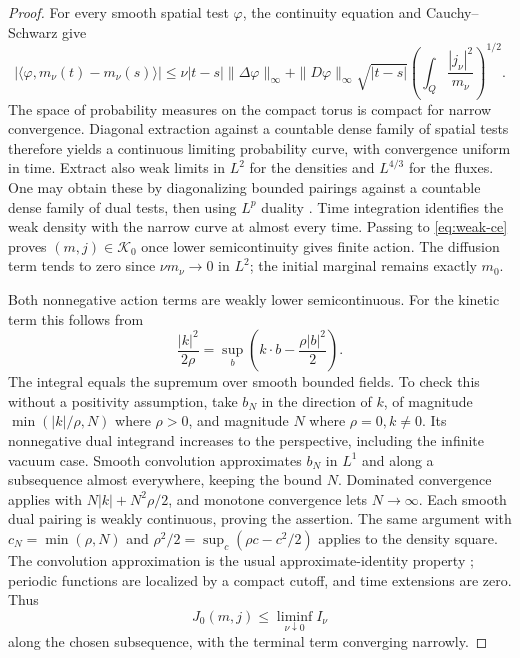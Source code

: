 \documentclass[11pt]{article}
\numberwithin{equation}{section}
\begin{document}
\begin{proof}
For every smooth spatial test \(\varphi\), the continuity equation and
Cauchy--Schwarz give
\begin{equation}\label{eq:narrow-mod}
 |\langle\varphi,m_\nu(t)-m_\nu(s)\rangle|
 \le \nu|t-s|\|\Delta\varphi\|_\infty
 +\|D\varphi\|_\infty\sqrt{|t-s|}
              \left(\int_Q\frac{|j_\nu|^2}{m_\nu}\right)^{1/2}.
\end{equation}
The space of probability measures on the compact torus is compact for narrow
convergence. Diagonal extraction against a countable dense family of
spatial tests therefore yields a continuous limiting probability curve,
with convergence uniform in time. Extract also weak limits in \(L^2\)
for the densities and \(L^{4/3}\) for the fluxes. One may obtain these
by diagonalizing bounded pairings against a countable dense family of
dual tests, then using \(L^p\) duality
\cite[Theorem~6.15, p.~190]{Folland}. Time integration identifies the weak
density with the narrow curve at almost every time.
Passing to \eqref{eq:weak-ce} proves
\((m,j)\in\mathcal K_0\) once lower semicontinuity gives finite action.
The diffusion term tends to zero since \(\nu m_\nu\to0\) in \(L^2\);
the initial marginal remains exactly \(m_0\).

Both nonnegative action terms are weakly lower semicontinuous. For the
kinetic term this follows from
\[
 \frac{|k|^2}{2\rho}
       =\sup_b\left(k\cdot b-\frac{\rho|b|^2}{2}\right).
\]
The integral equals the supremum over smooth bounded fields. To check
this without a positivity assumption, take \(b_N\) in the direction
of \(k\), of magnitude \(\min(|k|/\rho,N)\) where \(\rho>0\),
and magnitude \(N\) where \(\rho=0,k\ne0\).
Its nonnegative dual integrand increases to the perspective, including
the infinite vacuum case. Smooth convolution approximates \(b_N\)
in \(L^1\) and along a subsequence almost everywhere, keeping the
bound \(N\). Dominated convergence applies with
\(N|k|+N^2\rho/2\), and monotone convergence lets \(N\to\infty\).
Each smooth dual pairing is weakly continuous, proving the assertion.
The same argument with \(c_N=\min(\rho,N)\) and
\(\rho^2/2=\sup_c(\rho c-c^2/2)\) applies to the density square.
The convolution approximation is the usual approximate-identity
property \cite[Theorem~8.14, pp.~242--243]{Folland}; periodic functions are localized
by a compact cutoff, and time extensions are zero. Thus
\begin{equation}\label{eq:liminf}
 J_0(m,j)\le\liminf_{\nu\downarrow0}I_\nu
\end{equation}
along the chosen subsequence, with the terminal term converging narrowly.


\end{proof}
\end{document}
